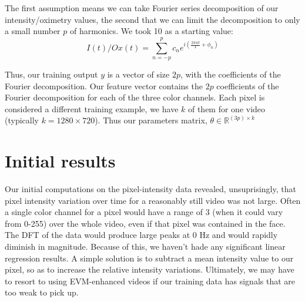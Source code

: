 \documentclass[12pt]{article}
\begin{document}
  The first assumption means we can take Fourier series decomposition of our intensity/oximetry values, the second that we can
  limit the decomposition to only a small number $p$ of harmonics. We took 10 as a starting value:
  \[
    I(t)/Ox(t) = \sum_{n=-p}^{p} c_n e^{i \left(\frac{2\pi nt}{T}  + \phi_n \right) }
  \]

  Thus, our training output $y$ is a vector of size $2p$, with the coefficients of the Fourier decomposition.
  Our feature vector contains the $2p$ coefficients of the Fourier decomposition for each of the three color channels.
  Each pixel is considered a different training example, we have $k$ of them for one video (typically \(k=1280\times 720\)).
  Thus our parameters matrix, $\theta \in \mathbb{R}^{(3p) \times k}$


\section{Initial results}
  Our initial computations on the pixel-intensity data revealed, unsuprisingly,
  that pixel intensity variation over time for a reasonably still video was not large.
  Often a single color channel for a pixel would have a range of 3 (when it could vary from 0-255) over the whole video, even if that pixel was contained in the face.
  The DFT of the data would produce large peaks at 0 Hz and would rapidly diminish in magnitude. Because of this, we haven't hade any significant linear regression results.
  A simple solution is to subtract a mean intensity value to our pixel, so as to increase the relative intensity variations.
  Ultimately, we may have to resort to using EVM-enhanced videos if our training data has signals that are too weak to pick up.


\end{document}
